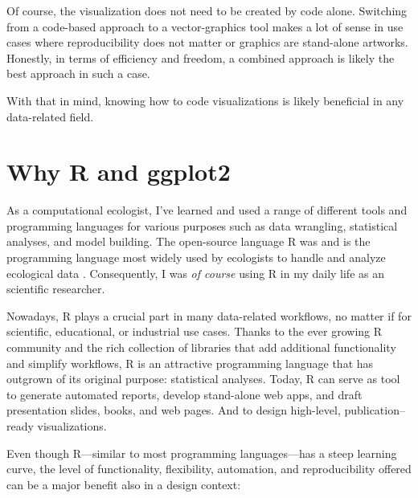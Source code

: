 \documentclass[
]{krantz}
\begin{document}
Of course, the visualization does not need to be created by code alone.
Switching from a code-based approach to a vector-graphics tool makes a
lot of sense in use cases where reproducibility does not matter or
graphics are stand-alone artworks. Honestly, in terms of efficiency and
freedom, a combined approach is likely the best approach in such a case.

With that in mind, knowing how to code visualizations is likely
beneficial in any data-related field.

\hypertarget{why}{%
\section{\texorpdfstring{Why R and \textbf{ggplot2}}{Why R and ggplot2}}\label{why}}

As a computational ecologist, I've learned and used a range of different tools and programming languages for various purposes such as data wrangling, statistical analyses, and model building. The open-source language R was and is the programming language most widely used by ecologists to handle and analyze ecological data \citep{sciaini2018}. Consequently, I was \emph{of course} using R in my daily life as an scientific researcher.

Nowadays, R plays a crucial part in many data-related workflows, no matter if for scientific, educational, or industrial use cases. Thanks to the ever growing R community and the rich collection of libraries that add additional functionality and simplify workflows, R is an attractive programming language that has outgrown of its original purpose: statistical analyses. Today, R can serve as tool to generate automated reports, develop stand-alone web apps, and draft presentation slides, books, and web pages. And to design high-level, publication--ready visualizations.

Even though R---similar to most programming languages---has a steep learning curve, the level of functionality, flexibility, automation, and reproducibility offered can be a major benefit also in a design context:
\end{document}
